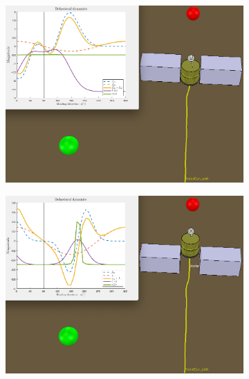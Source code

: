 \begin{figure}[htb!]
\begin{subfigure}{.49\textwidth}
  \caption{}%
  \label{fig:lyapunov-tar-obs-2}
  \end{subfigure} 
  \begin{subfigure}{.49\textwidth}
    \includegraphics[width=\textwidth]{img/lyapunov-tar-obs-3.PNG}%
  \caption{}%
  \label{fig:lyapunov-tar-obs-3}
  \end{subfigure}
  \begin{subfigure}{.49\textwidth}
    \includegraphics[width=\textwidth]{img/lyapunov-tar-obs-4.PNG}%
  \caption{}%
  \label{fig:lyapunov-tar-obs-4}
  \end{subfigure}
  \begin{subfigure}{.49\textwidth}

\end{subfigure}
\end{figure}
